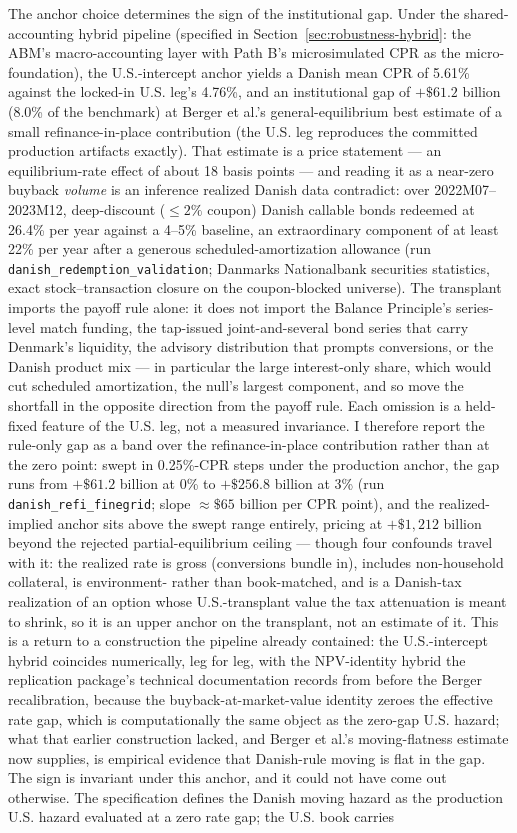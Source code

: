 \documentclass[12pt]{article}
\begin{document}
The anchor choice determines the sign of the institutional gap. Under the shared-accounting hybrid pipeline (specified in Section~\ref{sec:robustness-hybrid}: the ABM's macro-accounting layer with Path B's microsimulated CPR as the micro-foundation), the U.S.-intercept anchor yields a Danish mean CPR of 5.61\% against the locked-in U.S. leg's 4.76\%, and an institutional gap of $+\$61.2$ billion (8.0\% of the benchmark) at Berger et al.'s general-equilibrium best estimate of a small refinance-in-place contribution (the U.S. leg reproduces the committed production artifacts exactly). That estimate is a price statement --- an equilibrium-rate effect of about 18 basis points --- and reading it as a near-zero buyback \emph{volume} is an inference realized Danish data contradict: over 2022M07--2023M12, deep-discount ($\leq 2\%$ coupon) Danish callable bonds redeemed at 26.4\% per year against a 4--5\% baseline, an extraordinary component of at least 22\% per year after a generous scheduled-amortization allowance (run \texttt{danish\_redemption\_validation}; Danmarks Nationalbank securities statistics, exact stock--transaction closure on the coupon-blocked universe). The transplant imports the payoff rule alone: it does not import the Balance Principle's series-level match funding, the tap-issued joint-and-several bond series that carry Denmark's liquidity, the advisory distribution that prompts conversions, or the Danish product mix --- in particular the large interest-only share, which would cut scheduled amortization, the null's largest component, and so move the shortfall in the opposite direction from the payoff rule. Each omission is a held-fixed feature of the U.S. leg, not a measured invariance. I therefore report the rule-only gap as a band over the refinance-in-place contribution rather than at the zero point: swept in 0.25\%-CPR steps under the production anchor, the gap runs from $+\$61.2$ billion at 0\% to $+\$256.8$ billion at 3\% (run \texttt{danish\_refi\_finegrid}; slope $\approx \$65$ billion per CPR point), and the realized-implied anchor sits above the swept range entirely, pricing at $+\$1{,}212$ billion beyond the rejected partial-equilibrium ceiling --- though four confounds travel with it: the realized rate is gross (conversions bundle in), includes non-household collateral, is environment- rather than book-matched, and is a Danish-tax realization of an option whose U.S.-transplant value the tax attenuation is meant to shrink, so it is an upper anchor on the transplant, not an estimate of it. This is a return to a construction the pipeline already contained: the U.S.-intercept hybrid coincides numerically, leg for leg, with the NPV-identity hybrid the replication package's technical documentation records from before the Berger recalibration, because the buyback-at-market-value identity zeroes the effective rate gap, which is computationally the same object as the zero-gap U.S. hazard; what that earlier construction lacked, and Berger et al.'s moving-flatness estimate now supplies, is empirical evidence that Danish-rule moving is flat in the gap. The sign is invariant under this anchor, and it could not have come out otherwise. The specification defines the Danish moving hazard as the production U.S. hazard evaluated at a zero rate gap; the U.S. book carries 
\end{document}
